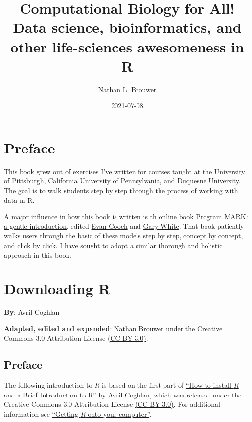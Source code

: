 \documentclass[
]{book}
\title{Computational Biology for All! Data science, bioinformatics, and other life-sciences awesomeness in R}
\author{Nathan L. Brouwer}
\date{2021-07-08}
\begin{document}
\maketitle

{
\setcounter{tocdepth}{1}
\tableofcontents
}
\hypertarget{preface}{%
\chapter*{Preface}\label{preface}}

This book grew out of exercises I've written for courses taught at the University of Pittsburgh, California University of Pennsylvania, and Duquesne University. The goal is to walk students step by step through the process of working with data in R.

A major influence in how this book is written is th online book \href{http://www.phidot.org/software/mark/docs/book/}{Program MARK: a gentle introduction}, edited \href{http://canuck.dnr.cornell.edu/}{Evan Cooch} and \href{https://sites.warnercnr.colostate.edu/gwhite/}{Gary White}. That book patiently walks users through the basic of these models step by step, concept by concept, and click by click. I have sought to adopt a similar thorough and holistic approach in this book.

\hypertarget{downloading-r}{%
\chapter{Downloading R}\label{downloading-r}}

\textbf{By}: Avril Coghlan

\textbf{Adapted, edited and expanded}: Nathan Brouwer under the Creative Commons 3.0 Attribution License \href{https://creativecommons.org/licenses/by/3.0/}{(CC BY 3.0)}.

\hypertarget{preface-1}{%
\section{Preface}\label{preface-1}}

The following introduction to \emph{R} is based on the first part of \href{https://a-little-book-of-r-for-bioinformatics.readthedocs.io/en/latest/src/installr.html}{``How to install \emph{R} and a Brief Introduction to R''} by Avril Coghlan, which was released under the Creative Commons 3.0 Attribution License \href{https://creativecommons.org/licenses/by/3.0/}{(CC BY 3.0)}. For additional information see \href{https://brouwern.github.io/BOOK_R_Ecological_Data_Science/getting-r-onto-your-computer.html}{``Getting \emph{R} onto your computer''}.
\end{document}
